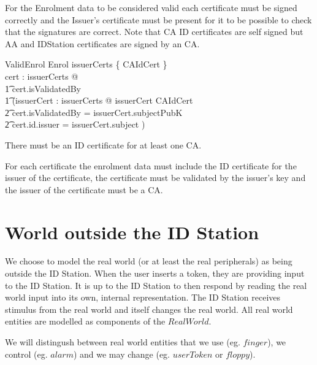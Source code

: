For the Enrolment data to be considered valid each certificate must be
signed correctly and the Issuer's certificate must be present for it
to be possible to check that the signatures are correct.
Note that CA ID
certificates are self signed but AA and IDStation certificates are
signed by an CA.

\begin{schema}{ValidEnrol}
        Enrol
\where
        issuerCerts \cap \{ CAIdCert \} \neq \emptyset
\also
\\      \forall cert : issuerCerts @ 
\\      \t1     cert.isValidatedBy \neq \Nil 
\\      \t1     \land (\exists issuerCert : issuerCerts @ 
        issuerCert \in CAIdCert 
\\      \t2     \land \The cert.isValidatedBy = issuerCert.subjectPubK
\\      \t2     \land cert.id.issuer = issuerCert.subject )   
\end{schema}
\begin{Zcomment}
\item
There must be an ID certificate for at least one CA.
\item
For each certificate the enrolment data must include the ID
certificate for the issuer of the certificate, the certificate must be
validated by the issuer's key and the issuer of the
certificate must be a CA.
\end{Zcomment}

\section{World outside the ID Station}
We choose to model the real world (or at least the real peripherals)
as being outside the ID Station.
When the user inserts a token, they are providing input to the ID Station.
It is up to the ID Station to then respond by reading the real world
input into its own, internal representation. The ID Station receives stimulus
from the real world and itself changes the real world. All real world
entities are modelled as components of the $RealWorld$.

We will distingush between real world entities that we use
 (eg. $finger$), we control (eg. $alarm$) 
 and we may change (eg. $userToken$ or $floppy$).


